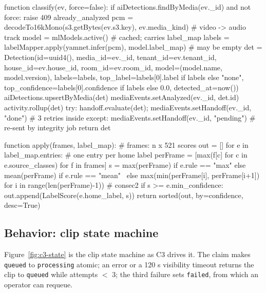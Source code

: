 \begin{Shaded}
\begin{Code}
function classify(ev, force=false):
    if aiDetections.findByMedia(ev._id) and not force: raise 409 already_analyzed
    pcm    = decodeTo16kMono(s3.getBytes(ev.s3.key), ev.media_kind)   # video -> audio track
    model  = mlModels.active()                                        # cached; carries label_map
    labels = labelMapper.apply(yamnet.infer(pcm), model.label_map)   # may be empty
    det = Detection(id=uuid4(), media_id=ev._id, tenant_id=ev.tenant_id, house_id=ev.house_id,
                    room_id=ev.room_id, model=(model.name, model.version), labels=labels,
                    top_label=labels[0].label if labels else "none",
                    top_confidence=labels[0].confidence if labels else 0.0, detected_at=now())
    aiDetections.upsertByMedia(det)
    mediaEvents.setAnalyzed(ev._id, det.id)
    activity.rollup(det)
    try:    handoff.evaluate(det); mediaEvents.setHandoff(ev._id, "done")     # 3 retries inside
    except: mediaEvents.setHandoff(ev._id, "pending")                         # re-sent by integrity job
    return det

function apply(frames, label_map):                    # frames: n x 521 scores
    out = []
    for e in label_map.entries:                        # one entry per home label
        perFrame = [max(f[c] for c in e.source_classes) for f in frames]
        s = max(perFrame) if e.rule == "max" else mean(perFrame) if e.rule == "mean" \
            else max(min(perFrame[i], perFrame[i+1]) for i in range(len(perFrame)-1))   # consec2
        if s >= e.min_confidence: out.append(LabelScore(e.home_label, s))
    return sorted(out, by=confidence, desc=True)
\end{Code}
\end{Shaded}

\subsection{Behavior: clip state machine}
Figure~\ref{fig:c3-state} is the clip state machine as C3 drives it. The claim makes \texttt{queued} to
\texttt{processing} atomic; an error or a 120 s visibility timeout returns the clip to \texttt{queued} while
attempts $<$ 3; the third failure sets \texttt{failed}, from which an operator can requeue.


